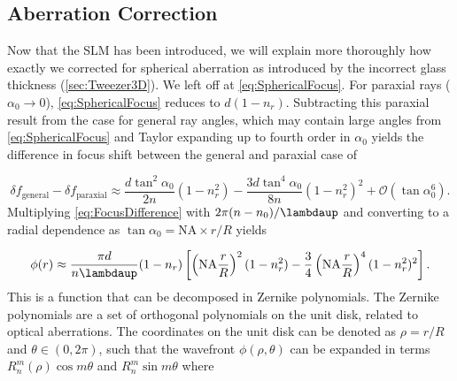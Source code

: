 \subsection{Aberration Correction}\label{subsec:AberrationCorrection}

Now that the SLM has been introduced, we will explain more thoroughly how exactly we corrected for spherical aberration as introduced by the incorrect glass thickness (\cref{sec:Tweezer3D}).
We left off at \cref{eq:SphericalFocus}.
For paraxial rays ($\alpha_0 \rightarrow 0$), \cref{eq:SphericalFocus} reduces to $d(1-n_r)$. 
Subtracting this paraxial result from the case for general ray angles, which may contain large angles from \cref{eq:SphericalFocus} and Taylor expanding up to fourth order in $\alpha_0$ yields the difference in focus shift between the general and paraxial case of \cite{Iwaniuk2011}

\begin{equation}\label{eq:FocusDifference}
    \delta f_{\text{general}} - \delta f_{\text{paraxial}} \approx
    \frac{d \tan^2{\alpha_0}}{2n} (1-n_r^2) - \frac{3d \tan^4{\alpha_0}}{8n}(1-n_r^2)^2+\mathcal{O}(\tan\alpha_0^6).
\end{equation}
Multiplying \cref{eq:FocusDifference} with $2\pi(n-n_0)/\lambdaup$ and converting to a radial dependence as $\tan{\alpha_0}= \text{NA} \times r/R$ yields 

\begin{equation}\label{eq:ConversionRadial}
    \phi(r) \approx \frac{\pi d}{n\lambdaup}(1-n_r)\left[
    \left(\text{NA}\frac{r}{R}\right)^2(1-n_r^2)-\frac{3}{4}\left(\text{NA}\frac{r}{ R}\right)^4(1-n_r^2)^2
    \right].
\end{equation}
This is a function that can be decomposed in Zernike polynomials.
The Zernike polynomials are a set of orthogonal polynomials on the unit disk, related to optical aberrations. 
The coordinates on the unit disk can be denoted as $\rho = r/R$ and $\theta \in (0, 2\pi)$, such that the wavefront $\phi(\rho,\theta)$ can be expanded in terms $R_n^m(\rho)\cos{m\theta}$ and $R_n^m\sin{m\theta}$ where 

